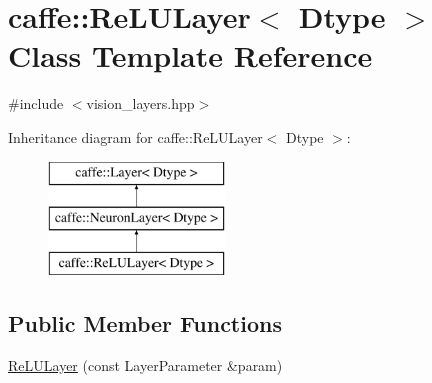 \hypertarget{classcaffe_1_1_re_l_u_layer}{\section{caffe\+:\+:Re\+L\+U\+Layer$<$ Dtype $>$ Class Template Reference}
\label{classcaffe_1_1_re_l_u_layer}
}


{\ttfamily \#include $<$vision\+\_\+layers.\+hpp$>$}

Inheritance diagram for caffe\+:\+:Re\+L\+U\+Layer$<$ Dtype $>$\+:\begin{figure}[H]
\begin{center}
\leavevmode
\includegraphics[height=3.000000cm]{classcaffe_1_1_re_l_u_layer}
\end{center}
\end{figure}
\subsection*{Public Member Functions}
\begin{DoxyCompactItemize}
\item 
\hyperlink{classcaffe_1_1_re_l_u_layer_aa6770fbbfd5e6f564c2ca19de7f7e712}{Re\+L\+U\+Layer} (const Layer\+Parameter \&param)
\end{DoxyCompactItemize}
